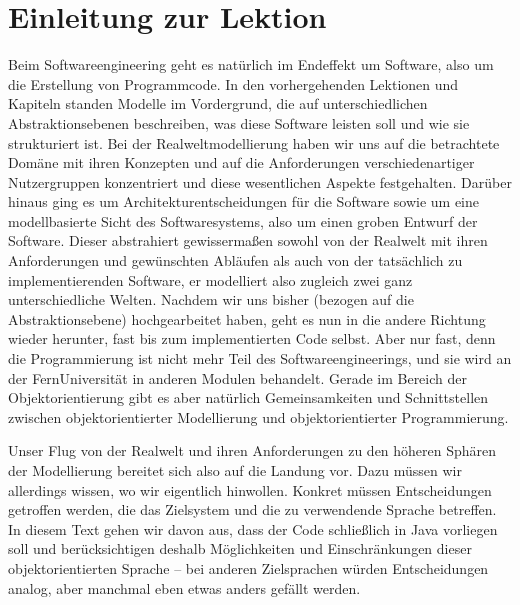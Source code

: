 \cleardoublepage
\chapter*{Einleitung zur Lektion}

Beim Softwareengineering geht es natürlich im Endeffekt um Software, also um die Erstellung von Programmcode. In den vorhergehenden Lektionen und Kapiteln standen Modelle im Vordergrund, die auf unterschiedlichen Abstraktions\-ebenen beschreiben, was diese Software leisten soll und wie sie strukturiert ist. Bei der Realwelt\-modellierung haben wir uns auf die betrachtete Domäne mit ihren Konzepten und auf die Anforderungen verschiedenartiger Nutzergruppen konzentriert und diese wesentlichen Aspekte festgehalten. Darüber hinaus ging es um Architektur\-entscheidungen für die Software sowie um eine modellbasierte Sicht des Softwaresystems, also um einen groben Entwurf der Software. Dieser abstrahiert gewissermaßen sowohl von der Realwelt mit ihren Anforderungen und gewünschten Abläufen als auch von der tatsächlich zu implementierenden Software, er modelliert also zugleich zwei ganz unterschiedliche Welten. Nachdem wir uns bisher (bezogen auf die Abstraktionsebene) hochgearbeitet haben, geht es nun in die andere Richtung wieder herunter, fast bis zum implementierten Code selbst. Aber nur fast, denn die Programmierung ist nicht mehr Teil des Softwareengineerings, und sie wird an der FernUniversität in anderen Modulen behandelt. Gerade im Bereich der Objekt\-orientierung gibt es aber natürlich Gemeinsamkeiten und Schnittstellen zwischen objektorientierter Modellierung und objektorientierter Programmierung.

Unser Flug von der Realwelt und ihren Anforderungen zu den höheren Sphären der Modellierung bereitet sich also auf die Landung vor. Dazu müssen wir allerdings wissen, wo wir eigentlich hinwollen. Konkret müssen Entscheidungen getroffen werden, die das Zielsystem und die zu verwendende Sprache betreffen. In diesem Text gehen wir davon aus, dass der Code schließlich in Java vorliegen soll und berücksichtigen deshalb Möglichkeiten und Einschränkungen dieser objektorientierten Sprache -- bei anderen Zielsprachen würden Entscheidungen analog, aber manchmal eben etwas anders gefällt werden. 

